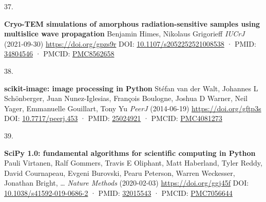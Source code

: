\documentclass[
]{article}
\newlength{\cslhangindent}
\newlength{\csllabelwidth}
\newlength{\cslentryspacingunit} %
\newenvironment{CSLReferences}[2] %
 {%
  \setlength{\parindent}{0pt}
  \ifodd #1
  \let\oldpar\par
  \def\par{\hangindent=\cslhangindent\oldpar}
  \fi
  \setlength{\parskip}{#2\cslentryspacingunit}
 }%
 {}
\newcommand{\CSLBlock}[1]{#1\hfill\break}
\newcommand{\CSLLeftMargin}[1]{\parbox[t]{\csllabelwidth}{#1}}
\newcommand{\CSLRightInline}[1]{\parbox[t]{\linewidth - \csllabelwidth}{#1}\break}
\providecommand{\DIFaddbegin}{} %
\providecommand{\DIFaddend}{} %
\providecommand{\DIFdelbegin}{} %
\providecommand{\DIFdelend}{} %
\newcommand{\DIFscaledelfig}{0.5}
\newlength{\DIFdelgraphicswidth} %
\newlength{\DIFdelgraphicsheight} %
\newcommand{\DIFaddincludegraphics}[2][]{{\color{blue}\fbox{\DIFOincludegraphics[#1]{#2}}}} %
\newcommand{\DIFdelincludegraphics}[2][]{%
\sbox{\DIFdelgraphicsbox}{\DIFOincludegraphics[#1]{#2}}%
\settoboxwidth{\DIFdelgraphicswidth}{\DIFdelgraphicsbox} %
\settoboxtotalheight{\DIFdelgraphicsheight}{\DIFdelgraphicsbox} %
\scalebox{\DIFscaledelfig}{%
\parbox[b]{\DIFdelgraphicswidth}{\usebox{\DIFdelgraphicsbox}\\[-\baselineskip] \rule{\DIFdelgraphicswidth}{0em}}\llap{\resizebox{\DIFdelgraphicswidth}{\DIFdelgraphicsheight}{%
\setlength{\unitlength}{\DIFdelgraphicswidth}%
\begin{picture}(1,1)%
\thicklines\linethickness{2pt} %
{\color[rgb]{1,0,0}\put(0,0){\framebox(1,1){}}}%
{\color[rgb]{1,0,0}\put(0,0){\line( 1,1){1}}}%
{\color[rgb]{1,0,0}\put(0,1){\line(1,-1){1}}}%
\end{picture}%
}\hspace*{3pt}}} %
} %
\DeclareRobustCommand{\DIFaddbegin}{\DIFOaddbegin \let\includegraphics\DIFaddincludegraphics} %
\DeclareRobustCommand{\DIFaddend}{\DIFOaddend \let\includegraphics\DIFOincludegraphics} %
\DeclareRobustCommand{\DIFdelbegin}{\DIFOdelbegin \let\includegraphics\DIFdelincludegraphics} %
\DeclareRobustCommand{\DIFdelend}{\DIFOaddend \let\includegraphics\DIFOincludegraphics} %
\begin{document}
\begin{CSLReferences}{0}{0}
\leavevmode{}%
\DIFdelbegin %
\DIFdelend \DIFaddbegin \CSLLeftMargin{37. }\DIFaddend %
\CSLRightInline{\textbf{Cryo-TEM simulations of amorphous radiation-sensitive samples using multislice wave propagation}
\CSLBlock{Benjamin Himes, Nikolaus Grigorieff} \emph{IUCrJ} (2021-09-30) \url{https://doi.org/gpzs9r}
\CSLBlock{DOI: \href{https://doi.org/10.1107/s2052252521008538}{10.1107/s2052252521008538} · PMID: \href{https://www.ncbi.nlm.nih.gov/pubmed/34804546}{34804546} · PMCID: \href{https://www.ncbi.nlm.nih.gov/pmc/articles/PMC8562658}{PMC8562658}}}

\leavevmode{}%
\DIFdelbegin %
\DIFdelend \DIFaddbegin \CSLLeftMargin{38. }\DIFaddend %
\CSLRightInline{\textbf{scikit-image: image processing in Python}
\CSLBlock{Stéfan van der Walt, Johannes L Schönberger, Juan Nunez-Iglesias, François Boulogne, Joshua D Warner, Neil Yager, Emmanuelle Gouillart, Tony Yu} \emph{PeerJ} (2014-06-19) \url{https://doi.org/gftp3s}
\CSLBlock{DOI: \href{https://doi.org/10.7717/peerj.453}{10.7717/peerj.453} · PMID: \href{https://www.ncbi.nlm.nih.gov/pubmed/25024921}{25024921} · PMCID: \href{https://www.ncbi.nlm.nih.gov/pmc/articles/PMC4081273}{PMC4081273}}}

\leavevmode{}%
\DIFdelbegin %
\DIFdelend \DIFaddbegin \CSLLeftMargin{39. }\DIFaddend %
\CSLRightInline{\textbf{SciPy 1.0: fundamental algorithms for scientific computing in Python}
\CSLBlock{Pauli Virtanen, Ralf Gommers, Travis E Oliphant, Matt Haberland, Tyler Reddy, David Cournapeau, Evgeni Burovski, Pearu Peterson, Warren Weckesser, Jonathan Bright, \ldots{} } \emph{Nature Methods} (2020-02-03) \url{https://doi.org/ggj45f}
\CSLBlock{DOI: \href{https://doi.org/10.1038/s41592-019-0686-2}{10.1038/s41592-019-0686-2} · PMID: \href{https://www.ncbi.nlm.nih.gov/pubmed/32015543}{32015543} · PMCID: \href{https://www.ncbi.nlm.nih.gov/pmc/articles/PMC7056644}{PMC7056644}}}


\end{CSLReferences}
\end{document}
